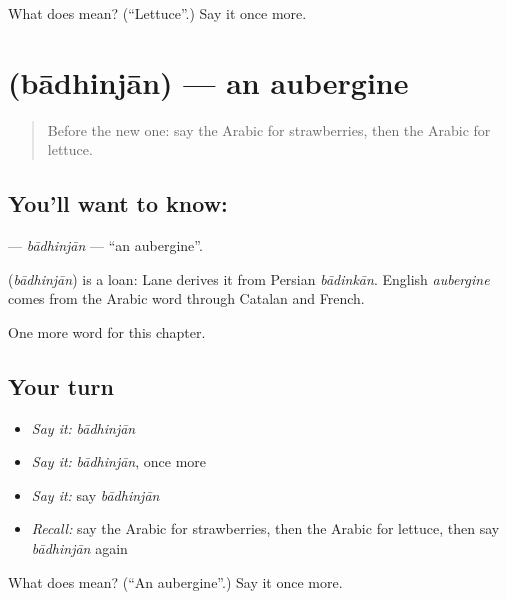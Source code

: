 \begin{tcolorbox}[breakable,colback=teal!4,colframe=teal!35!black,title={Before you move on}]
What does  mean? (\textquotedblleft{}Lettuce\textquotedblright{}.) Say it once more.
\end{tcolorbox}
\section[\texorpdfstring{\ar{باذنجان} (bādhinjān)}{باذنجان (bādhinjān)}]{ (bādhinjān) — an aubergine}

\label{lesson:AR-C120-badhinjan}



\begin{quote}
Before the new one: say the Arabic for strawberries, then the Arabic for lettuce.
\end{quote}

\subsection*{You'll want to know: }
\textbf{} — \emph{bādhinjān} — \textquotedblleft{}an aubergine\textquotedblright{}.

\begin{cousinweb}
\textbf{} (\emph{bādhinjān}) is a loan: Lane derives it from Persian \emph{bādinkān}. English \emph{aubergine} comes from the Arabic word through Catalan and French.
\end{cousinweb}

\begin{grammarlens}[title={What you've built}]
One more word for this chapter.
\end{grammarlens}

\subsection*{Your turn}
\begin{itemize}
\raggedright
  \item \emph{Say it:} \emph{bādhinjān}
  \item \emph{Say it:} \emph{bādhinjān}, once more
  \item \emph{Say it:} say \emph{bādhinjān}
  \item \emph{Recall:} say the Arabic for strawberries, then the Arabic for lettuce, then say \emph{bādhinjān} again
\end{itemize}

\begin{tcolorbox}[breakable,colback=teal!4,colframe=teal!35!black,title={Before you move on}]
What does  mean? (\textquotedblleft{}An aubergine\textquotedblright{}.) Say it once more.
\end{tcolorbox}
